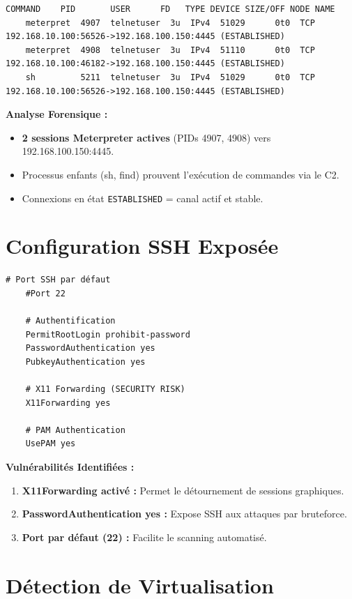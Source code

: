 \documentclass[12pt,a4paper,openany]{report}
\begin{document}
\begin{lstlisting}[style=logstyle,caption=Fichier : Active Network Connections]
	COMMAND    PID       USER      FD   TYPE DEVICE SIZE/OFF NODE NAME
	meterpret  4907  telnetuser  3u  IPv4  51029      0t0  TCP 192.168.10.100:56526->192.168.100.150:4445 (ESTABLISHED)
	meterpret  4908  telnetuser  3u  IPv4  51110      0t0  TCP 192.168.10.100:46182->192.168.100.150:4445 (ESTABLISHED)
	sh         5211  telnetuser  3u  IPv4  51029      0t0  TCP 192.168.10.100:56526->192.168.100.150:4445 (ESTABLISHED)
\end{lstlisting}

\textbf{Analyse Forensique :}
\begin{itemize}
	\item \textbf{2 sessions Meterpreter actives} (PIDs 4907, 4908) vers 192.168.100.150:4445.
	\item Processus enfants (sh, find) prouvent l'exécution de commandes via le C2.
	\item Connexions en état \texttt{ESTABLISHED} = canal actif et stable.
\end{itemize}

\section{Configuration SSH Exposée}

\begin{lstlisting}[caption=Extrait de /etc/ssh/sshd\_config]
	# Port SSH par défaut
	#Port 22
	
	# Authentification
	PermitRootLogin prohibit-password
	PasswordAuthentication yes
	PubkeyAuthentication yes
	
	# X11 Forwarding (SECURITY RISK)
	X11Forwarding yes
	
	# PAM Authentication
	UsePAM yes
\end{lstlisting}

\textbf{Vulnérabilités Identifiées :}
\begin{enumerate}
	\item \textbf{X11Forwarding activé :} Permet le détournement de sessions graphiques.
	\item \textbf{PasswordAuthentication yes :} Expose SSH aux attaques par bruteforce.
	\item \textbf{Port par défaut (22) :} Facilite le scanning automatisé.
\end{enumerate}

\section{Détection de Virtualisation}
\end{document}
